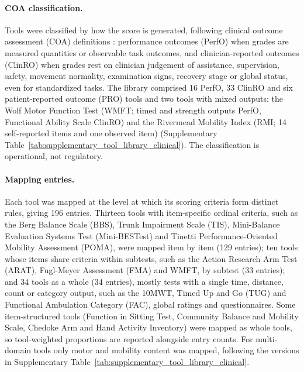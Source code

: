\documentclass[11pt]{article}
\begin{document}
\paragraph{COA classification.} Tools were classified by how the score is generated, following clinical outcome assessment (COA) definitions \cite{FDANIH2016BESTCOA,Walton2015COAConceptualFoundation}: performance outcomes (PerfO) when grades are measured quantities or observable task outcomes, and clinician-reported outcomes (ClinRO) when grades rest on clinician judgement of assistance, supervision, safety, movement normality, examination signs, recovery stage or global status, even for standardized tasks. The library comprised 16 PerfO, 33 ClinRO and six patient-reported outcome (PRO) tools and two tools with mixed outputs: the Wolf Motor Function Test (WMFT; timed and strength outputs PerfO, Functional Ability Scale ClinRO) and the Rivermead Mobility Index (RMI; 14 self-reported items and one observed item) (Supplementary Table~\ref{tab:supplementary_tool_library_clinical}). The classification is operational, not regulatory.

\paragraph{Mapping entries.} Each tool was mapped at the level at which its scoring criteria form distinct rules, giving 196 entries. Thirteen tools with item-specific ordinal criteria, such as the Berg Balance Scale (BBS), Trunk Impairment Scale (TIS), Mini-Balance Evaluation Systems Test (Mini-BESTest) and Tinetti Performance-Oriented Mobility Assessment (POMA), were mapped item by item (129 entries); ten tools whose items share criteria within subtests, such as the Action Research Arm Test (ARAT), Fugl-Meyer Assessment (FMA) and WMFT, by subtest (33 entries); and 34 tools as a whole (34 entries), mostly tests with a single time, distance, count or category output, such as the 10MWT, Timed Up and Go (TUG) and Functional Ambulation Category (FAC), global ratings and questionnaires. Some item-structured tools (Function in Sitting Test, Community Balance and Mobility Scale, Chedoke Arm and Hand Activity Inventory) were mapped as whole tools, so tool-weighted proportions are reported alongside entry counts. For multi-domain tools only motor and mobility content was mapped, following the versions in Supplementary Table~\ref{tab:supplementary_tool_library_clinical}.
\end{document}
